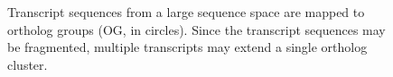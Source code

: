 \begin{figure}[ht]
	\centering
	\def\svgwidth{0.8\textwidth}
	
	\caption[Graph-based approach to orthology prediction]{
		Transcript sequences from a large sequence space are mapped to ortholog
		groups (OG, in circles). Since the transcript sequences may be fragmented,
		multiple transcripts may extend a single ortholog cluster.
	}
	\label{fig:graph}
\end{figure}


